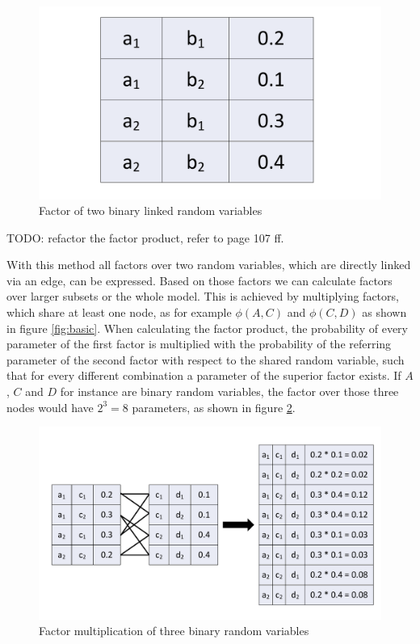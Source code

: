 \begin{figure}[htpb]
  \centering
  	\includegraphics[scale=0.3]{img/param.pdf} 
  \caption{Factor of two binary linked random variables}
  \label{fig:param}
\end{figure}

TODO: refactor the factor product, refer to \cite{koller2009probabilistic} page 107 ff.

With this method all factors over two random variables, which are directly linked via an edge, can be expressed. Based on those factors we can calculate factors over larger subsets or the whole model. This is achieved by multiplying factors, which share at least one node, as for example $\phi(A,C)$ and $\phi(C,D)$ as shown in figure \ref{fig:basic}. When calculating the factor product, the probability of every parameter of the first factor is multiplied with the probability of the referring parameter of the second factor with respect to the shared random variable, such that for every different combination a parameter of the superior factor exists. If $A$, $C$ and $D$ for instance are binary random variables, the factor over those three nodes would have $2^3=8$ parameters, as shown in figure \ref{fig:parammult}.

\begin{figure}[htpb]
  \centering
  	\includegraphics[scale=0.4]{img/parammult.pdf} 
  \caption{Factor multiplication of three binary random variables}
  \label{fig:parammult}
\end{figure}

